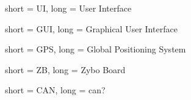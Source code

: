 {
	short = {UI},
	long = {User Interface}
}

{
	short = {GUI},
	long = {Graphical User Interface}
}

{
	short = {GPS},
	long = {Global Positioning System}
}

{
	short = {ZB},
	long = {Zybo Board}
}

{
	short = {CAN},
	long = {can?}
}

